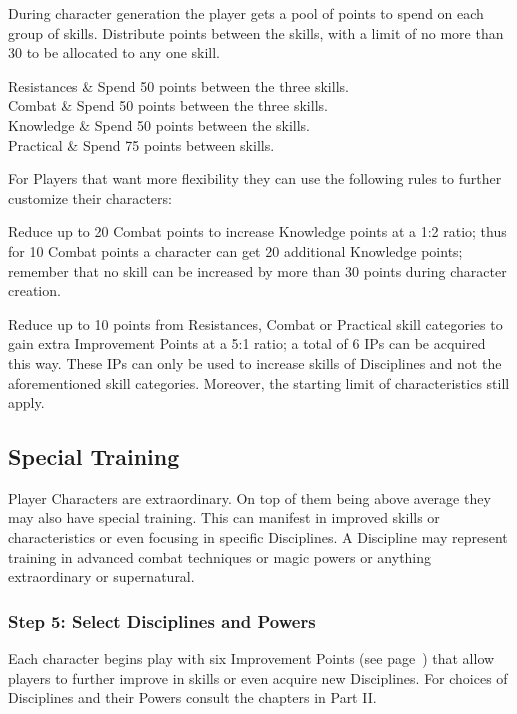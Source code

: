 During character generation the player gets a pool of points to spend on each group of skills. Distribute points between the skills, with a limit of no more than 30 to be allocated to any one skill.

\begin{rpg-table}[|l|X|]
	\hline
	Resistances   & Spend 50 points between the three skills.\\
	Combat        & Spend 50 points between the three skills.\\
	Knowledge     & Spend 50 points between the skills.\\
	Practical     & Spend 75 points between skills.\\
	\hline
\end{rpg-table}

For Players that want more flexibility they can use the following rules to further customize their characters:
\begin{rpg-list}
\item Reduce up to 20 Combat points to increase Knowledge points at a 1:2 ratio; thus for 10 Combat points a character can get 20 additional Knowledge points; remember that no skill can be increased by more than 30 points during character creation.
\item Reduce up to 10 points from Resistances, Combat or Practical skill categories to gain extra Improvement Points at a 5:1 ratio; a total of 6 IPs can be acquired this way. These IPs can only be used to increase skills of Disciplines and not the aforementioned skill categories. Moreover, the starting limit of characteristics still apply.
\end{rpg-list}

\subsection{Special Training}
Player Characters are extraordinary. On top of them being above average they may also have special training. This can manifest in improved skills or characteristics or even focusing in specific Disciplines. A Discipline may represent training in advanced combat techniques or magic powers or anything extraordinary or supernatural.


\subsubsection{Step 5: Select Disciplines and Powers}
Each character begins play with six Improvement Points (see page~\pageref{ssec:improvement-points}) that allow players to further improve in skills or even acquire new Disciplines. For choices of Disciplines and their Powers consult the chapters in Part II.

